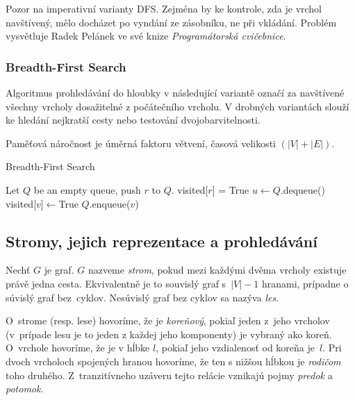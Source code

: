 Pozor na  imperativní varianty DFS. Zejména by ke kontrole,
zda je vrchol navštívený, mělo docházet po vyndání ze zásobníku, ne při
vkládání.
Problém vysvětluje Radek Pelánek ve své knize {\em Programátorská
cvičebnice}.

\subsubsection*{Breadth-First Search}

Algoritmus prohledávání do hloubky v následující variantě označí za
navštívené všechny vrcholy dosažitelné z počátečního vrcholu. V drobných
variantách slouží ke hledání nejkratší cesty nebo testování
dvojobarvitelnosti.

Paměťová náročnost je úměrná faktoru větvení, časová velikosti
$(\lvert V \rvert + \lvert E \rvert)$.

\begin{algorithm}
\caption{Breadth-First Search}
\begin{algorithmic}[1]
    \State Let $Q$ be an empty queue, push $r$ to $Q$.
    \State visited[$r$] = True
        \State $u \gets Q$.dequeue()
                \State visited[$v$]$ \gets $True
                \State $Q$.enqueue($v$)
            \EndIf
        \EndFor
    \EndWhile
\EndFunction
\end{algorithmic}
\end{algorithm}


\subsection{Stromy, jejich reprezentace a prohledávání}

Nechť $G$ je graf. $G$ nazveme {\em strom}, pokud mezi každými dvěma
vrcholy existuje právě jedna cesta. Ekvivalentně je to souvislý graf
s~$\lvert V \rvert - 1$ hranami, prípadne o súvislý graf bez~cyklov. 
Nesúvislý graf bez cyklov sa nazýva {\em les}. 

O~strome (resp. lese) hovoríme, že je {\em koreňový}, pokiaľ jeden 
z~jeho vrcholov (v~prípade lesu je to jeden z každej jeho komponenty)
je vybraný ako koreň. O~vrchole hovoríme, že je v hĺbke $l$, pokiaľ 
jeho vzdialenosť od koreňa je~$l$. Pri dvoch vrcholoch spojených
hranou hovoríme, že ten s nižšou hĺbkou je {\em rodičom} toho druhého.
Z~tranzitívneho uzáveru tejto relácie vznikajú pojmy {\em predok} a 
{\em potomok}.

